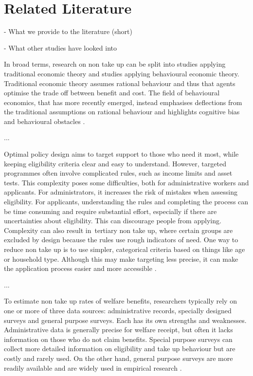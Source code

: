 \section{Related Literature} \label{sec:literature}

- What we provide to the literature (short) 

- What other studies have looked into

In broad terms, research on non take up can be split into studies applying traditional economic theory and studies applying behavioural economic theory. Traditional economic theory assumes rational behaviour and thus that agents optimise the trade off between benefit and cost. The field of behavioural economics, that has more recently emerged, instead emphasises deflections from the traditional assumptions on rational behaviour and highlights cognitive bias and behavioural obstacles \citep{mechelen_who_2017}.

...

Optimal policy design aims to target support to those who need it most, while keeping eligibility criteria clear and easy to understand. However, targeted programmes often involve complicated rules, such as income limits and asset tests. This complexity poses some difficulties, both for administrative workers and applicants. For administrators, it increases the risk of mistakes when assessing eligibility. For applicants, understanding the rules and completing the process can be time consuming and require substantial effort, especially if there are uncertainties about eligibility. This can discourage people from applying. Complexity can also result in tertiary non take up, where certain groups are excluded by design because the rules use rough indicators of need. One way to reduce non take up is to use simpler, categorical criteria based on things like age or household type. Although this may make targeting less precise, it can make the application process easier and more accessible \citep{mechelen_who_2017}.

...

To estimate non take up rates of welfare benefits, researchers typically rely on one or more of three data sources: administrative records, specially designed surveys and general purpose surveys. Each has its own strengths and weaknesses. Administrative data is generally precise for welfare receipt, but often it lacks information on those who do not claim benefits. Special purpose surveys can collect more detailed information on eligibility and take up behaviour but are costly and rarely used. On the other hand, general purpose surveys are more readily available and are widely used in empirical research \citep{mechelen_who_2017}.

